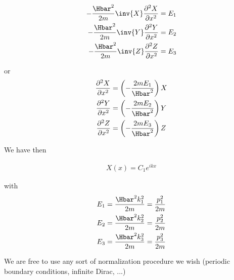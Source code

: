 \begin{align*}
-\frac{\Hbar^2}{2m} \inv{X} \frac{\partial^2 X}{\partial {x}^2} &= E_1 \\
-\frac{\Hbar^2}{2m} \inv{Y} \frac{\partial^2 Y}{\partial {x}^2} &= E_2 \\
-\frac{\Hbar^2}{2m} \inv{Z} \frac{\partial^2 Z}{\partial {x}^2} &= E_3
\end{align*}

or
\begin{align*}
\frac{\partial^2 X}{\partial {x}^2} &= \left( - \frac{2m E_1}{\Hbar^2} \right) X  \\
\frac{\partial^2 Y}{\partial {x}^2} &= \left( - \frac{2m E_2}{\Hbar^2} \right) Y  \\
\frac{\partial^2 Z}{\partial {x}^2} &= \left( - \frac{2m E_3}{\Hbar^2} \right) Z
\end{align*}

We have then

\begin{align*}
X(x) = C_1 e^{i k x}
\end{align*}

with
\begin{align*}
E_1 &= \frac{\Hbar^2 k_1^2 }{2m} = \frac{p_1^2}{2m} \\
E_2 &= \frac{\Hbar^2 k_2^2 }{2m} = \frac{p_2^2}{2m} \\
E_3 &= \frac{\Hbar^2 k_3^2 }{2m} = \frac{p_3^2}{2m}
\end{align*}

We are free to use any sort of normalization procedure we wish (periodic boundary conditions, infinite Dirac, ...)

